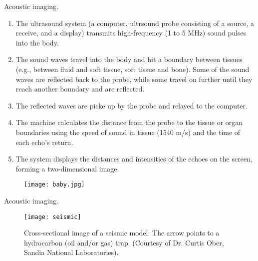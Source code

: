 \begin{frame}
Acoustic imaging.
\begin{enumerate}
\item The ultrasound system (a computer, ultrsound probe consisting of a source, a receive, and a display) transmits high-frequency (1 to 5 MHz) sound pulses into the body.
\item The sound waves travel into the body and hit a boundary between tissues (e.g., between fluid and soft tissue, soft tissue and bone). Some of the sound waves are reflected back to the probe, while some travel on further until they reach another boundary and are reflected.
\item The reflected waves are picke up by the probe and relayed to the computer.
\item The machine calculates the distance from the probe to the tissue or organ boundaries using the speed of sound in tissue (1540 m/s) and the time of each echo's return.
\item The system displays the distances and intensities of the echoes on the screen, forming a two-dimensional image.
\end{enumerate}
\end{frame}


\begin{frame}
\begin{figure}
\texttt{[image: baby.jpg]}
\end{figure}
\end{frame}


\begin{frame}
Acoustic imaging.
\begin{figure}
\texttt{[image: seismic]}
\caption{Cross-sectional image of a seismic model. The arrow points to a hydrocarbon (oil and/or gas) trap. (Courtesy of Dr. Curtis Ober, Sandia National Laboratories).}
\end{figure}
\end{frame}


